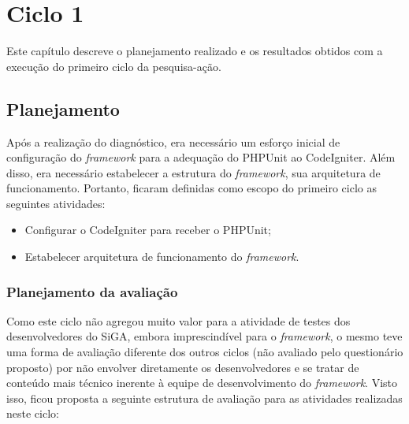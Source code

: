 \chapter{Ciclo 1}
  
  Este capítulo descreve o planejamento realizado e os resultados obtidos com a execução do primeiro ciclo da pesquisa-ação.
  
  \section{Planejamento}
  
      Após a realização do diagnóstico, era necessário um esforço inicial de configuração do \textit{framework} para a 
      adequação do PHPUnit ao CodeIgniter. Além disso, era necessário estabelecer a estrutura do \textit{framework},
      sua arquitetura de funcionamento. Portanto, ficaram definidas como escopo do primeiro ciclo as seguintes atividades:
      
      \begin{itemize}
	
	\item Configurar o CodeIgniter para receber o PHPUnit;
	
	\item Estabelecer arquitetura de funcionamento do \textit{framework}.
	
      \end{itemize}
      
      
      \subsection{Planejamento da avaliação}
      
	  Como este ciclo não agregou muito valor para a atividade de testes dos desenvolvedores do SiGA,
	  embora imprescindível para o \textit{framework}, o mesmo teve uma forma de avaliação diferente
	  dos outros ciclos (não avaliado pelo questionário proposto) por não envolver diretamente os desenvolvedores e se
	  tratar de conteúdo mais técnico inerente à equipe de desenvolvimento do \textit{framework}. Visto isso, ficou proposta
	  a seguinte estrutura de avaliação para as atividades realizadas neste ciclo:
	  
